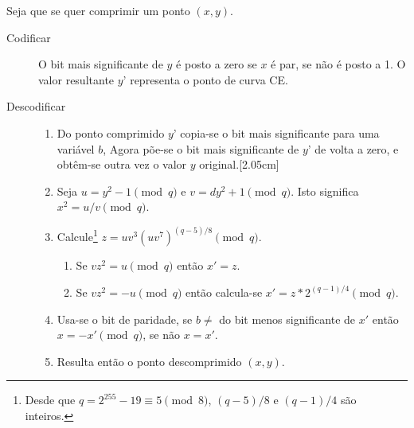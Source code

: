 \begin{enumerate}
Seja que se quer comprimir um ponto \((x, y)\).

\begin{description}
	\item[Codificar] O bit mais significante de $y$ é posto a zero se $x$ é par, se não é posto a 1. O valor resultante $y’$ representa o ponto de curva CE.
	
	\item[Descodificar] \hfill
	    \begin{enumerate}
    	    \item Do ponto comprimido $y’$ copia-se o bit mais significante para uma variável $b$, Agora põe-se o bit mais significante de $y’$ de volta a zero, e obtêm-se outra vez o valor $y$ original.[2.05cm]    
    	    \item Seja \(u = y^2-1 \pmod q\) e \(v = d y^2  + 1 \pmod q\). Isto significa $x^2 = u/v \pmod q$.
    	    \item Calcule\footnote{Desde que $q = 2^{255}-19 \equiv 5 \pmod{8}$, $(q-5)/8$ e $(q-1)/4$ são inteiros.} \(z = u v^3 (u v^7)^{(q-5)/8} \pmod q\).
            \begin{enumerate}
                \item Se \(v z^2 = u \pmod q\) então \(x' = z\).
                \item Se \(v z^2 = -u \pmod q\) então calcula-se \(x' = z*2^{(q-1)/4} \pmod q\).
            \end{enumerate}
            \item Usa-se o bit de paridade, se $b \ne$ do bit menos significante de $x'$ então \(x = -x' \pmod q\), se não \(x = x'\).
            \item Resulta então o ponto descomprimido $(x,y)$.
	    \end{enumerate}
\end{description}


\end{enumerate}
